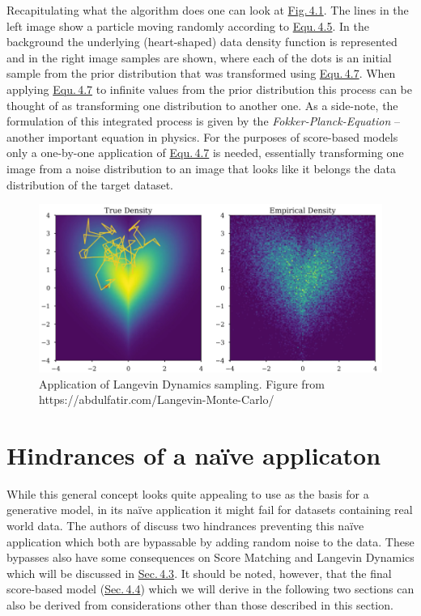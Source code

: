 Recapitulating what the algorithm does one can look at \hyperref[fig:4.1]{Fig.\,4.1}. The lines in the left image show a particle moving randomly according to \hyperref[equ:4.5]{Equ.\,4.5}. In the background the underlying (heart-shaped) data density function  is represented and in the right image samples are shown, where each of the dots is an initial sample from the prior distribution that was transformed using \hyperref[equ:4.7]{Equ.\,4.7}. When applying \hyperref[equ:4.7]{Equ.\,4.7} to infinite values from the prior distribution this process can be thought of as transforming one distribution to another one. As a side-note, the formulation of this integrated process is given by the \textit{Fokker-Planck-Equation} \cite{gardiner} – another important equation in physics. For the purposes of score-based models only a one-by-one application of \hyperref[equ:4.7]{Equ.\,4.7} is needed, essentially transforming one image from a noise distribution to an image that looks like it belongs the data distribution of the target dataset.
%
\begin{figure}[] \label{fig:4.1}
    \centering
    \includegraphics[width=.8\textwidth]{Chapters/figures/langevin.PNG}
    \caption[Application of Langevin Dynamics sampling]{Application of Langevin Dynamics sampling. Figure from\\ https://abdulfatir.com/Langevin-Monte-Carlo/}
\end{figure}
\section{Hindrances of a na\"{i}ve applicaton} \label{sec:4.2}
While this general concept looks quite appealing to use as the basis for a generative model, in its na\"{i}ve application it might fail for datasets containing real world data. The authors of \cite{score_1} discuss two hindrances preventing this na\"{i}ve application which both are bypassable by adding random noise to the data. These bypasses also have some consequences on Score Matching and Langevin Dynamics which will be discussed in \hyperref[sec:4.3]{Sec.\,4.3}. It should be noted, however, that the final score-based model (\hyperref[sec:4.4]{Sec.\,4.4}) which we will derive in the following two sections can also be derived from considerations other than those described in this section.
%
